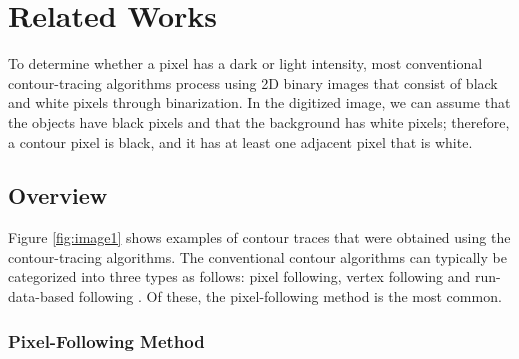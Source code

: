 \documentclass[sensors,article,accept,moreauthors,pdftex,10pt,a4paper]{mdpi}
\begin{document}

\section{Related Works}


To determine whether a pixel has a dark or light intensity, most conventional contour-tracing algorithms process using 2D binary images that consist of black and white pixels through binarization. In the digitized image, we can assume that the objects have black pixels and that the background has white pixels; therefore, a contour pixel is black, and it has at least one adjacent pixel that is white.

\subsection{Overview}

Figure \ref{fig:image1} shows examples of contour traces that were obtained using the contour-tracing algorithms. The conventional contour algorithms can typically be categorized into three types as follows: pixel following, vertex following and run-data-based following \cite{Miyatake1997Contour,Danielsson1981Improvement,Shoji1999Contour}. Of these, the pixel-following method is the most common.

\subsubsection{Pixel-Following Method}
\end{document}
